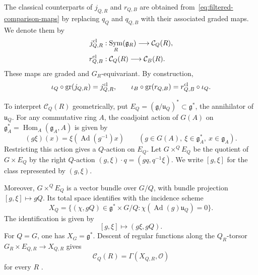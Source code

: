 \documentclass[twoside,a4paper,12pt,reqno]{amsart}
\theoremstyle{remark}
\numberwithin{equation}{section}
\newcommand{\cO}{\mathcal O}
\newcommand{\fg}{\mathfrak g}
\newcommand{\fu}{\mathfrak u}
\DeclareMathOperator{\Sym}{Sym}
\DeclareMathOperator{\Ad}{Ad}
\DeclareMathOperator{\gr}{gr}
\begin{document}
The classical counterparts of \(j_{Q,R}\) and \(r_{Q,B}\) are obtained
from~\eqref{eq:filtered-comparison-maps} by replacing \(q_Q\) and
\(q_{Q,B}\) with their associated graded maps. We denote them by
\[
\begin{aligned}
j^{\rm cl}_{Q,R}&:\Sym_R(\fg_R)\longrightarrow\mathcal C_Q(R),\\
r^{\rm cl}_{Q,B}&:\mathcal C_Q(R)\longrightarrow\mathcal C_B(R).
\end{aligned}
\]
These maps are graded and \(G_R\)-equivariant. By construction,
\begin{equation}\label{eq:graded-maps}
\iota_Q\circ\gr(j_{Q,R})=j^{\rm cl}_{Q,R},\qquad
\iota_B\circ\gr(r_{Q,B})=r^{\rm cl}_{Q,B}\circ\iota_Q.
\end{equation}

To interpret \(\mathcal C_Q(R)\) geometrically, put
\(E_Q=(\fg/\fu_Q)^*\subset\fg^*\), the annihilator of \(\fu_Q\).
For any commutative ring \(A\), the coadjoint action of \(G(A)\) on
\(\fg_A^*=\operatorname{Hom}_A(\fg_A,A)\) is given by
\[
(g\xi)(x)=\xi(\Ad(g^{-1})x)
\qquad(g\in G(A),\ \xi\in\fg_A^*,\ x\in\fg_A).
\]
Restricting this action gives a \(Q\)-action on \(E_Q\).
Let \(G\times^Q E_Q\) be the quotient of \(G\times E_Q\) by the right
\(Q\)-action \((g,\xi)\cdot q=(gq,q^{-1}\xi)\).
We write \([g,\xi]\) for the class represented by \((g,\xi)\). %

Moreover, \(G\times^Q E_Q\) is a vector bundle over \(G/Q\), with
bundle projection \([g,\xi]\mapsto gQ\). Its total space identifies with
the incidence scheme
\[
X_Q=\{(\chi,gQ)\in\fg^*\times G/Q:
       \chi(\Ad(g)\fu_Q)=0\}.
\]
The identification is given by
\[
[g,\xi]\longmapsto(g\xi,gQ).
\]
For \(Q=G\), one has \(X_G=\fg^*\).
Descent of regular functions along the \(Q_R\)-torsor
\(G_R\times E_{Q,R}\to X_{Q,R}\) gives
\begin{equation}\label{eq:incidence-functions}
\mathcal C_Q(R)=\Gamma(X_{Q,R},\cO)
\end{equation}
for every \(R\) \cite[Tag 023Q]{Stacks}.
\end{document}
